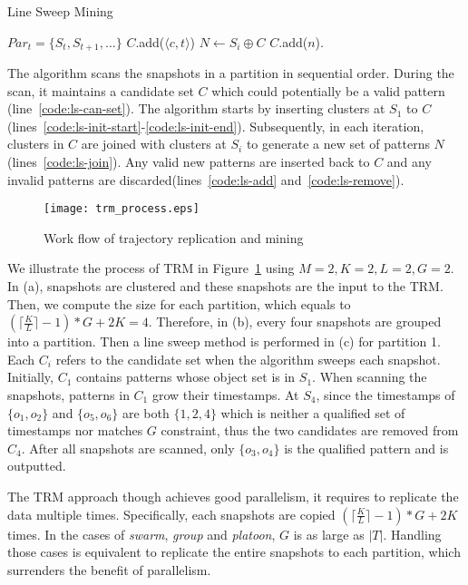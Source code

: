 \begin{algorithm}
\caption{Line Sweep Mining}
\label{algo:line-sweep}
\begin{algorithmic}[1]
\Require $Par_t = \{S_t, S_{t+1}, ...\}$
  \label{code:ls-can-set}
\label{code:ls-init-start}
\State $C$.add($\langle c, t \rangle $)
\EndFor
\label{code:ls-init-end}
\State $N \gets S_i \oplus C$ \label{code:ls-join}
			$C$.add($n$).
			\label{code:ls-add}
		\EndIf
	\EndFor
{}
	\label{code:ls-remove}
\EndFor
{}
\end{algorithmic}
\end{algorithm}

The algorithm scans the snapshots in a partition in sequential order. During the scan, it
maintains a candidate set $C$ which could potentially be a valid pattern (line~\ref{code:ls-can-set}).
The algorithm starts by inserting clusters at $S_1$ to $C$ (lines~\ref{code:ls-init-start}-\ref{code:ls-init-end}).
Subsequently, in each iteration, clusters in $C$ are joined with clusters at $S_i$ to generate
a new set of patterns $N$(lines~\ref{code:ls-join}). Any valid new patterns are inserted back to $C$
and any invalid patterns are discarded(lines~\ref{code:ls-add} and~\ref{code:ls-remove}).

\begin{figure}[h]
\centering
\texttt{[image: trm\_process.eps]}
\caption{Work flow of trajectory replication and mining}
\label{fig:trm_process}
\end{figure}

\begin{example}
We illustrate the process of TRM in Figure~\ref{fig:trm_process} using $M=2, K=2, L = 2, G=2$. In (a), snapshots are clustered and these snapshots are the input to the TRM. Then, we compute the size 
for each partition, which equals to $(\lceil \frac{K}{L} \rceil-1) *G+2K = 4$. Therefore, in (b), every four snapshots
are grouped into a partition. Then a line sweep method is performed in (c) for partition 1. Each
$C_i$ refers to the candidate set  when the algorithm sweeps each snapshot. Initially, $C_1$ contains
patterns whose object set is in $S_1$. When scanning the snapshots, patterns in $C_1$ grow
their timestamps. At $S_4$, since the timestamps of $\{o_1,o_2\}$ and $\{o_5,o_6\}$ 
are both $\{1,2,4\}$ which is neither a qualified set of timestamps nor matches $G$ constraint, 
thus the two candidates are removed from $C_4$. After all snapshots are scanned, 
only $\{o_3,o_4\}$ is the qualified pattern and is outputted.
\end{example}


The TRM approach though achieves good parallelism, 
it requires to replicate the data multiple times. 
Specifically, each snapshots are copied $(\lceil \frac{K}{L} \rceil -1) *G+2K$ times. 
In the cases of \emph{swarm}, \emph{group} and \emph{platoon}, $G$ is as large as $|T|$. 
Handling those cases is equivalent to replicate the entire snapshots to each partition, 
which surrenders the benefit of parallelism.

